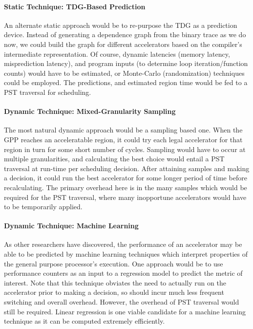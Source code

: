 \paragraph{Static Technique: TDG-Based Prediction}
An alternate static approach would be to re-purpose the TDG as a prediction device.
Instead of generating a dependence graph from the binary trace as we do now, we could
build the graph for different accelerators based on the compiler's intermediate 
representation.  Of course, dynamic latencies (memory latency, misprediction latency),
and program inputs (to determine loop iteration/function counts) would have to be 
estimated, or Monte-Carlo (randomization) techniques could be employed. The predictions,
and estimated region time would be fed to a PST traversal for scheduling.

\paragraph{Dynamic Technique: Mixed-Granularity Sampling} The most natural dynamic
approach would be a sampling based one.  When the GPP reaches an acceleratable
region, it could try each legal accelerator for that region in turn for some
short number of cycles.  Sampling would have to occur at multiple
granularities, and calculating the best choice would entail a PST traversal at
run-time per scheduling decision.
After attaining samples and making a decision, it could run the best accelerator for some longer period of time before recalculating.  The primary overhead here is in 
the many samples which would be required for the PST traversal,
where many inopportune accelerators would have to be temporarily applied.

\paragraph{Dynamic Technique: Machine Learning} As other researchers have
discovered, the performance of an accelerator may be able to be predicted by
machine learning techniques which interpret properties of the general purpose
processor's execution.  One approach would be to use performance counters as an
input to a regression model to predict the metric of interest. Note that this
technique obviates the need to actually run on the accelerator prior to making
a decision, so should incur much less frequent switching and overall overhead.
However, the overhead of PST traversal would still be required.  Linear
regression is one viable candidate for a machine learning technique as it can
be computed extremely efficiently.  
 
